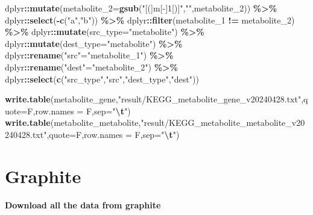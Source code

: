 \documentclass[
]{book}
\newenvironment{Shaded}{\begin{snugshade}}{\end{snugshade}}
\newcommand{\AttributeTok}[1]{\textcolor[rgb]{0.13,0.29,0.53}{#1}}
\newcommand{\FunctionTok}[1]{\textcolor[rgb]{0.13,0.29,0.53}{\textbf{#1}}}
\newcommand{\NormalTok}[1]{#1}
\newcommand{\OtherTok}[1]{\textcolor[rgb]{0.56,0.35,0.01}{#1}}
\newcommand{\SpecialCharTok}[1]{\textcolor[rgb]{0.81,0.36,0.00}{\textbf{#1}}}
\newcommand{\StringTok}[1]{\textcolor[rgb]{0.31,0.60,0.02}{#1}}
\begin{document}
\begin{Shaded}
\begin{Highlighting}[]
\NormalTok{  dplyr}\SpecialCharTok{::}\FunctionTok{mutate}\NormalTok{(}\AttributeTok{metabolite\_2=}\FunctionTok{gsub}\NormalTok{(}\StringTok{"[(]m[{-}]1[)]"}\NormalTok{,}\StringTok{""}\NormalTok{,metabolite\_2)) }\SpecialCharTok{\%\textgreater{}\%}
\NormalTok{  dplyr}\SpecialCharTok{::}\FunctionTok{select}\NormalTok{(}\SpecialCharTok{{-}}\FunctionTok{c}\NormalTok{(}\StringTok{"a"}\NormalTok{,}\StringTok{"b"}\NormalTok{)) }\SpecialCharTok{\%\textgreater{}\%}
\NormalTok{  dplyr}\SpecialCharTok{::}\FunctionTok{filter}\NormalTok{(metabolite\_1 }\SpecialCharTok{!=}\NormalTok{ metabolite\_2) }\SpecialCharTok{\%\textgreater{}\%}
\NormalTok{  dplyr}\SpecialCharTok{::}\FunctionTok{mutate}\NormalTok{(}\AttributeTok{src\_type=}\StringTok{"metabolite"}\NormalTok{) }\SpecialCharTok{\%\textgreater{}\%}
\NormalTok{  dplyr}\SpecialCharTok{::}\FunctionTok{mutate}\NormalTok{(}\AttributeTok{dest\_type=}\StringTok{"metabolite"}\NormalTok{) }\SpecialCharTok{\%\textgreater{}\%}
\NormalTok{  dplyr}\SpecialCharTok{::}\FunctionTok{rename}\NormalTok{(}\StringTok{"src"}\OtherTok{=}\StringTok{"metabolite\_1"}\NormalTok{) }\SpecialCharTok{\%\textgreater{}\%}
\NormalTok{  dplyr}\SpecialCharTok{::}\FunctionTok{rename}\NormalTok{(}\StringTok{"dest"}\OtherTok{=}\StringTok{"metabolite\_2"}\NormalTok{) }\SpecialCharTok{\%\textgreater{}\%}
\NormalTok{  dplyr}\SpecialCharTok{::}\FunctionTok{select}\NormalTok{(}\FunctionTok{c}\NormalTok{(}\StringTok{"src\_type"}\NormalTok{,}\StringTok{"src"}\NormalTok{,}\StringTok{"dest\_type"}\NormalTok{,}\StringTok{"dest"}\NormalTok{))}


\FunctionTok{write.table}\NormalTok{(metabolite\_gene,}\StringTok{"result/KEGG\_metabolite\_gene\_v20240428.txt"}\NormalTok{,}\AttributeTok{quote=}\NormalTok{F,}\AttributeTok{row.names =}\NormalTok{ F,}\AttributeTok{sep=}\StringTok{"}\SpecialCharTok{\textbackslash{}t}\StringTok{"}\NormalTok{)}
\FunctionTok{write.table}\NormalTok{(metabolite\_metabolite,}\StringTok{"result/KEGG\_metabolite\_metabolite\_v20240428.txt"}\NormalTok{,}\AttributeTok{quote=}\NormalTok{F,}\AttributeTok{row.names =}\NormalTok{ F,}\AttributeTok{sep=}\StringTok{"}\SpecialCharTok{\textbackslash{}t}\StringTok{"}\NormalTok{)}
\end{Highlighting}
\end{Shaded}

\section{Graphite}\label{graphite}

\textbf{Download all the data from graphite}
\end{document}

